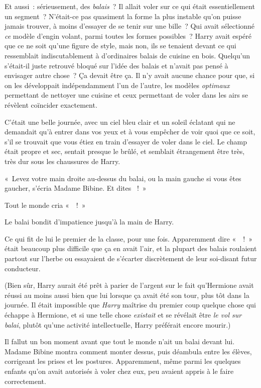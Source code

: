 Et aussi~: sérieusement, des \emph{balais}~? Il allait voler sur ce qui était essentiellement un segment~? N'était-ce pas quasiment la forme la plus instable qu'on puisse jamais trouver, à moins d'essayer de se tenir sur une bille~? Qui avait sélectionné \emph{ce} modèle d'engin volant, parmi toutes les formes possibles~? Harry avait espéré que ce ne soit qu'une figure de style, mais non, ils se tenaient devant ce qui ressemblait indiscutablement à d'ordinaires balais de cuisine en bois. Quelqu'un s'était-il juste retrouvé bloqué sur l'idée des balais et n'avait pas pensé à envisager autre chose~? Ça devait être ça. Il n'y avait aucune chance pour que, si on les développait indépendamment l'un de l'autre, les modèles \emph{optimaux} permettant de nettoyer une cuisine et ceux permettant de voler dans les airs se révèlent coïncider exactement.

C'était une belle journée, avec un ciel bleu clair et un soleil éclatant qui ne demandait qu'à entrer dans vos yeux et à vous empêcher de voir quoi que ce soit, s'il se trouvait que vous étiez en train d'essayer de voler dans le ciel. Le champ était propre et sec, sentait presque le brûlé, et semblait étrangement être très, très dur sous les chaussures de Harry.

«~Levez votre main droite au-dessus du balai, ou la main gauche si vous êtes gaucher, s'écria Madame Bibine. Et dites ~!~»

Tout le monde cria «~~!~»

Le balai bondit d'impatience jusqu'à la main de Harry.

Ce qui fit de lui le premier de la classe, pour une fois. Apparemment dire «~~!~» était beaucoup plus difficile que ça en avait l'air, et la plupart des balais roulaient partout sur l'herbe ou essayaient de s'écarter discrètement de leur soi-disant futur conducteur.

(Bien sûr, Harry aurait été prêt à parier de l'argent sur le fait qu'Hermione avait réussi au moins aussi bien que lui lorsque ça avait été son tour, plus tôt dans la journée. Il était impossible que \emph{Harry} maîtrise du premier coup quelque chose qui échappe à Hermione, et si une telle chose \emph{existait} et se révélait être \emph{le vol sur balai}, plutôt qu'une activité intellectuelle, Harry préférait encore mourir.)

Il fallut un bon moment avant que tout le monde n'ait un balai devant lui. Madame Bibine montra comment monter dessus, puis déambula entre les élèves, corrigeant les prises et les postures. Apparemment, même parmi les quelques enfants qu'on avait autorisés à voler chez eux, peu avaient appris à le faire correctement.

